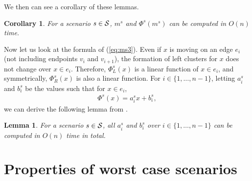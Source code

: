 \documentclass[a4paper]{llncs}
\newtheorem{lem}{Lemma}
\newtheorem{coro}{Corollary}
\begin{document}
\noindent
We then can see a corollary of these lemmas.

\begin{coro}
For a scenario $s \in {\cal S}$, $m^s$ and $\Phi^s(m^s)$ can be computed in $O(n)$ time.
\label{coro:mst}
\end{coro}



Now let us look at the formula of (\ref{eq:ms3}).
Even if $x$ is moving on an edge $e_i$ (not including endpoints $v_i$ and $v_{i+1}$), the formation of left clusters for $x$ does not change over $x \in e_i$.
Therefore, $\Phi^s_L(x)$ is a linear function of $x \in e_i$, and symmetrically, $\Phi^s_R(x)$ is also a linear function.
For $i \in \{1, \ldots, n-1\}$, letting $a^s_i$ and $b^s_i$ be the values such that for $x \in e_i$,
\begin{eqnarray}
\Phi^s(x) = a^s_ix + b^s_i,
\label{eq:aibi}
\end{eqnarray}
we can derive the following lemma from \cite{hgk14_2,hgk14_4}.

\begin{lem}
For a scenario $s \in {\cal S}$, all $a^s_i$ and $b^s_i$ over $i \in \{1, \ldots, n-1\}$ can be computed in $O(n)$ time in total.
\label{lem:abt}
\end{lem}





\section{Properties of worst case scenarios}
\label{sec:pwcs}
\end{document}
